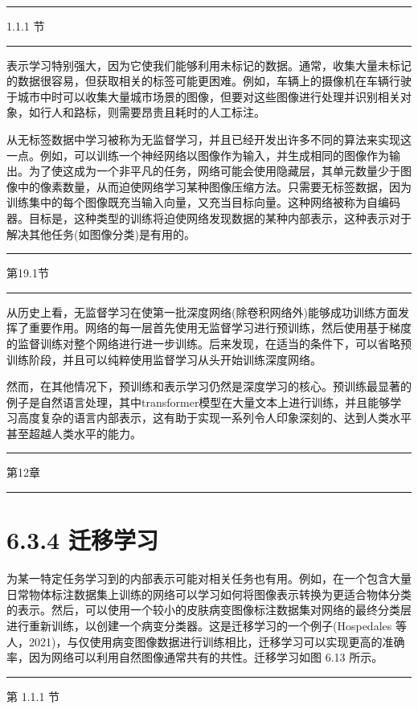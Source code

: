 \documentclass[10pt]{report}
\newcommand{\HRule}{\begin{center}\rule{0.9\linewidth}{0.2mm}\end{center}}
\begin{document}
\HRule

1.1.1 节

\HRule

表示学习特别强大，因为它使我们能够利用未标记的数据。通常，收集大量未标记的数据很容易，但获取相关的标签可能更困难。例如，车辆上的摄像机在车辆行驶于城市中时可以收集大量城市场景的图像，但要对这些图像进行处理并识别相关对象，如行人和路标，则需要昂贵且耗时的人工标注。

从无标签数据中学习被称为无监督学习，并且已经开发出许多不同的算法来实现这一点。例如，可以训练一个神经网络以图像作为输入，并生成相同的图像作为输出。为了使这成为一个非平凡的任务，网络可能会使用隐藏层，其单元数量少于图像中的像素数量，从而迫使网络学习某种图像压缩方法。只需要无标签数据，因为训练集中的每个图像既充当输入向量，又充当目标向量。这种网络被称为自编码器。目标是，这种类型的训练将迫使网络发现数据的某种内部表示，这种表示对于解决其他任务(如图像分类)是有用的。

\HRule

第19.1节

\HRule

从历史上看，无监督学习在使第一批深度网络(除卷积网络外)能够成功训练方面发挥了重要作用。网络的每一层首先使用无监督学习进行预训练，然后使用基于梯度的监督训练对整个网络进行进一步训练。后来发现，在适当的条件下，可以省略预训练阶段，并且可以纯粹使用监督学习从头开始训练深度网络。

然而，在其他情况下，预训练和表示学习仍然是深度学习的核心。预训练最显著的例子是自然语言处理，其中transformer模型在大量文本上进行训练，并且能够学习高度复杂的语言内部表示，这有助于实现一系列令人印象深刻的、达到人类水平甚至超越人类水平的能力。

\HRule

第12章

\HRule

\section*{6.3.4 迁移学习}

为某一特定任务学习到的内部表示可能对相关任务也有用。例如，在一个包含大量日常物体标注数据集上训练的网络可以学习如何将图像表示转换为更适合物体分类的表示。然后，可以使用一个较小的皮肤病变图像标注数据集对网络的最终分类层进行重新训练，以创建一个病变分类器。这是迁移学习的一个例子(Hospedales 等人，2021)，与仅使用病变图像数据进行训练相比，迁移学习可以实现更高的准确率，因为网络可以利用自然图像通常共有的共性。迁移学习如图 6.13 所示。

\HRule

第 1.1.1 节
\end{document}
